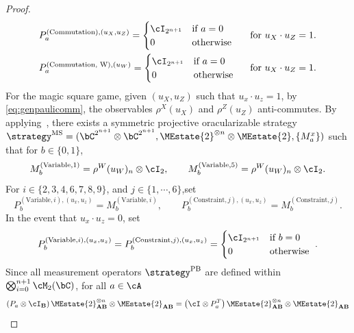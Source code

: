 \begin{proof}
\begin{align*}
		&P^{(\text{Commutation}), (u_X, u_Z) }_{a} = \begin{cases}
			\cI_{2^{n+1}} & \text{if } a= 0\\
			0 & \text{otherwise } \\
		\end{cases} & \text{ for } u_X \cdot u_Z = 1. \\
	& P^{(\text{Commutation, W}), (u_W) }_{a}  = \begin{cases}
		\cI_{2^{n+1}} & \text{if } a= 0\\
		0 & \text{otherwise } \\
	\end{cases} & \text{ for } u_X \cdot u_Z = 1. 
	\end{align*}
	For the magic square game, given $(u_X, u_Z)$ such that $u_x \cdot u_z = 1$, by \eqref{eq:genpaulicomm}, the observables $\rho^{X}(u_X)$ and  $\rho^{Z}(u_Z)$ anti-commutes. By applying~\cite[Theorem 7.11]{jiMIPRE2022a}, there exists a symmetric projective oracularizable strategy $\strategy^{\text{MS}} = (\bC^{2^{n+1}} \otimes \bC^{2^{n+1}}, \MEstate{2}^{\otimes n} \otimes \MEstate{2}, \{M_a^x \})$ such that for $b \in \{0,1\}$, 
	\begin{equation*}
		M_b^{(\text{Variable},1)} = \rho^{W}(u_W)_n \otimes \cI_2, \qquad M_b^{(\text{Variable},5)} = \rho^{W}(u_W)_n  \otimes \cI_2.
	\end{equation*}
	For $i \in \{2,3,4,6,7,8,9\}$, and $j \in \{1 ,\cdots, 6\}$,set 
	\begin{equation*}
		P_b^{(\text{Variable},i), (u_x, u_z)} = M_b^{(\text{Variable},i)}, \qquad P_b^{(\text{Constraint},j), (u_x, u_z)} = M_b^{(\text{Constraint},j)}. 
	\end{equation*}
	In the event that  $u_x \cdot u_z = 0$, set 
	\begin{equation*}
		P_b^{(\text{Variable},i), (u_x, u_z)} = P_b^{(\text{Constraint},j), (u_x, u_z)} = \begin{cases}
			\cI_{2^{n+1}} & \text{if } b= 0\\
			0 & \text{otherwise } \\
		\end{cases}. 
	\end{equation*}
	Since all measurement operators $\strategy^{\text{PB}}$ are defined within $\bigotimes_{i = 0}^{n+1} \cM_2(\bC)$, for all $a \in \cA$
	\begin{equation*}
		\left(P_{a} \otimes \cI_{\mathbf{B}} \right) \MEstate{2}^{\otimes n}_{\mathbf{AB}} \otimes \MEstate{2}_{\mathbf{AB}}  = \left( \cI \otimes P_{a}^{T} \right) \MEstate{2}^{\otimes n}_{\mathbf{AB}} \otimes \MEstate{2}_{\mathbf{AB}}

\end{equation*}
\end{proof}
